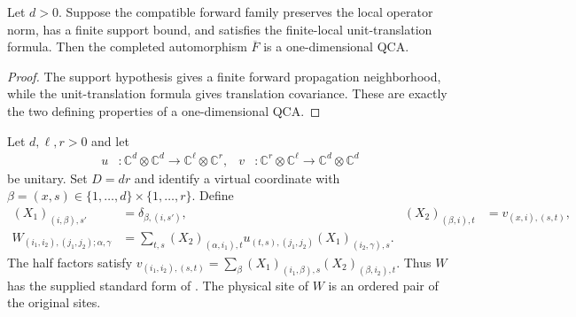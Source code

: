 \begin{lemma}
    \label{thm:qca_compatible_local_automorphism}
    \leanok
    Let $d>0$.  Suppose the compatible forward family preserves the local
    operator norm, has a finite support bound, and satisfies the finite-local
    unit-translation formula.  Then the completed automorphism $\overline F$ is
    a one-dimensional QCA.
\end{lemma}

\begin{proof}\leanok
    The support hypothesis gives a finite forward propagation neighborhood,
    while the unit-translation formula gives translation covariance.  These
    are exactly the two defining properties of a one-dimensional QCA.
\end{proof}







\begin{definition}
    \label{def:mpu_tensor_from_two_gates}
    \leanok
    Let $d,\ell,r>0$ and let
    \begin{align}
        u                                 & : \mathbb C^d\otimes\mathbb C^d\longrightarrow
        \mathbb C^\ell\otimes\mathbb C^r, &
        v                                 & : \mathbb C^r\otimes\mathbb C^\ell\longrightarrow
        \mathbb C^d\otimes\mathbb C^d
    \end{align}
    be unitary. Set $D=dr$ and identify a virtual coordinate with
    $\beta=(x,s)\in\{1,\ldots,d\}\times\{1,\ldots,r\}$. Define
    \begin{align}
        (X_1)_{(i,\beta),s'} & =\delta_{\beta,(i,s')},           &
        (X_2)_{(\beta,i),t}  & =v_{(x,i),(s,t)},                   \\
        W_{(i_1,i_2),(j_1,j_2);\alpha,\gamma}
                             & =\sum_{t,s}(X_2)_{(\alpha,i_1),t}
        u_{(t,s),(j_1,j_2)}(X_1)_{(i_2,\gamma),s}.
    \end{align}
    The half factors satisfy
    $v_{(i_1,i_2),(s,t)}=\sum_\beta
        (X_1)_{(i_1,\beta),s}(X_2)_{(\beta,i_2),t}$.
    Thus $W$ has the supplied standard form of
    \cite[equation~\textup{StandardForm}, lines~603--622]{Cirac2017MPU}.
    The physical site of $W$ is an ordered pair of the original sites.
\end{definition}


